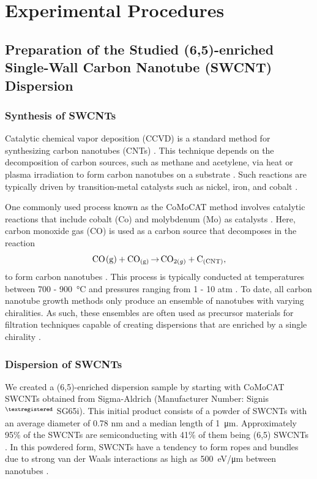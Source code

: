 \chapter{Experimental Procedures}

\section{Preparation of the Studied (6,5)-enriched Single-Wall Carbon Nanotube (SWCNT) Dispersion }

\subsection{Synthesis of SWCNTs}

Catalytic chemical vapor deposition (CCVD) is a standard method for synthesizing carbon nanotubes (CNTs) \cite{prasek2011methods, agboola2007conceptual}. This technique depends on the decomposition of carbon sources, such as methane and acetylene, via heat or plasma irradiation to form carbon nanotubes on a substrate \cite{agboola2007conceptual}. Such reactions are typically driven by transition-metal catalysts such as nickel, iron, and cobalt \cite{prasek2011methods}.

One commonly used process known as the CoMoCAT method involves catalytic reactions that include cobalt (Co) and molybdenum (Mo) as catalysts \cite{resasco2002scalable}. Here, carbon monoxide gas (CO) is used as a carbon source that decomposes in the reaction
\vspace{-2mm}
\begin{equation}
\ce{CO_(g) + CO_{(g)} $\rightarrow$ CO_{2(g)} + C_{(CNT)}},
\end{equation}
to form carbon nanotubes \cite{resasco2002scalable}. This process is typically conducted at temperatures between 700 - \SI{900}{\celsius} and pressures ranging from 1 - 10 atm \cite{resasco2002scalable}. To date, all carbon nanotube growth methods only produce an ensemble of nanotubes with varying chiralities. As such, these ensembles are often used as precursor materials for filtration techniques capable of creating dispersions that are enriched by a single chirality \cite{ichinose2017extraction, liu2011large}.

\subsection{Dispersion of SWCNTs}
We created a (6,5)-enriched dispersion sample by starting with CoMoCAT SWCNTs obtained from Sigma-Aldrich (Manufacturer Number: Signis$^{\tiny{\textregistered}}$ SG65i). This initial product consists of a powder of SWCNTs with an average diameter of 0.78 nm and a median length of \SI{1}{\micro \meter}. Approximately 95\% of the SWCNTs are semiconducting with 41\% of them being (6,5) SWCNTs . In this powdered form, SWCNTs have a tendency to form ropes and bundles due to strong van der Waals interactions as high as \SI{500}{\electronvolt / \micro \meter} between nanotubes \cite{vaisman2006role}.

